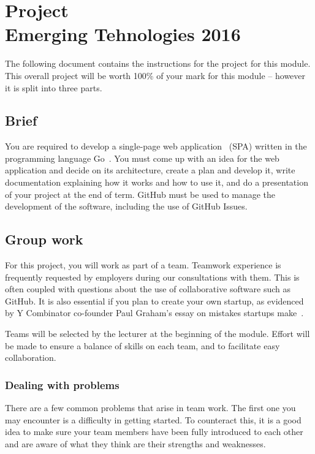 
\section*{Project \\ {\small Emerging Tehnologies 2016}}

\noindent
The following document contains the instructions for the project for this module.
This overall project will be worth 100\% of your mark for this module -- however it is split into three parts.


\subsection*{Brief}
You are required to develop a single-page web application~\cite{gowebapp} (SPA) written in the programming language Go~\cite{golang}.
You must come up with an idea for the web application and decide on its architecture, create a plan and develop it, write documentation explaining how it works and how to use it, and do a presentation of your project at the end of term.
GitHub must be used to manage the development of the software, including the use of GitHub Issues.


\subsection*{Group work}
For this project, you will work as part of a team.
Teamwork experience is frequently requested by employers during our consultations with them.
This is often coupled with questions about the use of collaborative software such as GitHub.
It is also essential if you plan to create your own startup, as evidenced by Y Combinator co-founder Paul Graham's essay on mistakes startups make~\cite{paulgrahammistakes}.

Teams will be selected by the lecturer at the beginning of the module.
Effort will be made to ensure a balance of skills on each team, and to facilitate easy collaboration.

\subsubsection*{Dealing with problems}
There are a few common problems that arise in team work.
The first one you may encounter is a difficulty in getting started.
To counteract this, it is a good idea to make sure your team members have been fully introduced to each other and are aware of what they think are their strengths and weaknesses.

